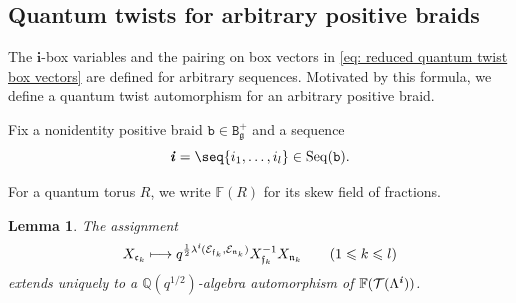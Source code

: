 \documentclass[12pt, leqno]{amsart}
\numberwithin{equation}{section}
\theoremstyle{plain}
\newtheorem{lemma}{Lemma}[section]
\theoremstyle{definition}
\renewcommand{\le}{\leqslant}
\newcommand{\g}{\mathfrak{g}}
\newcommand{\Q}{\mathbb{Q}}
\newcommand{\ii}{ \textbf{\textit{i}}}
\newcommand{\frakc}{\mathfrak{c}}
\newcommand{\frakf}{\mathfrak{f}}
\newcommand{\frakn}{\mathfrak{n}}
\newcommand{\bbF}{\mathbb{F}}
\newcommand{\bfi}{\mathbf{i}}
\newcommand{\calE}{\mathcal{E}}
\newcommand{\calT}{\mathcal{T}}
\newcommand{\ttB}{\mathtt{B}}
\newcommand{\ttb}{\mathtt{b}}
\newcommand{\Seq}{\mathrm{Seq}}
\begin{document}
\subsection{Quantum twists for arbitrary positive braids}
\label{subsec: terminal box seed arbitrary word}
\label{subsec: arbitrary positive word DT construction}
The $\bfi$-box variables and the pairing on box vectors in
\eqref{eq: reduced quantum twist box vectors} are defined for
arbitrary sequences.  Motivated by this formula, we define a quantum
twist automorphism for an arbitrary positive braid.

Fix a nonidentity positive braid $\ttb\in\ttB_\g^+$ and a sequence
\[
\ii=\seq{i_1,\ldots,i_l}\in\Seq(\ttb).
\]

For a quantum torus $R$, we write $\bbF(R)$
for its skew field of fractions.

\begin{lemma}
\label{lem: positive word twist coordinates}
The assignment
\begin{equation}
X_{\frakc_k}\longmapsto
q^{\frac12\lambda^\ii(\calE_{\frakf_k},\calE_{\frakn_k})}
X_{\frakf_k}^{-1}X_{\frakn_k}
\qquad(1\le k\le l)
\label{eq: quantum twist box coordinates}
\end{equation}
extends uniquely to a $\Q(q^{1/2})$-algebra automorphism of
$\bbF(\calT(\Lambda^\ii))$.
\end{lemma}
\end{document}
